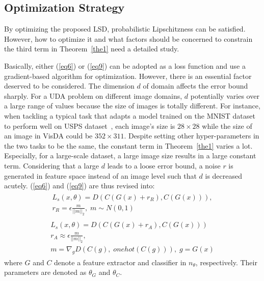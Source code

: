 \documentclass[journal,twocolumn]{IEEEtran}
\theoremstyle{definition}
\begin{document}
\subsection{Optimization Strategy}

By optimizing the proposed LSD,  probabilistic Lipschitzness can be satisfied. However, how to optimize it and what factors should be concerned to constrain the third term in Theorem~\ref{the1} need a detailed study.

Basically, either (\ref{eq6}) or (\ref{eq9}) can be adopted as a loss function and use a gradient-based algorithm for optimization. However, there is an essential factor deserved to be considered. The dimension $d$ of domain affects the error bound sharply. For a UDA problem on different image domains, $d$ potentially varies over a large range of values because the size of images is totally different. For instance, when tackling a typical task that adapts a model trained on the MNIST dataset~\cite{726791} to perform well on USPS dataset~\cite{291440}, each image's size is $28\times28$ while the size of an image in VisDA could be $352\times311$. Despite setting other hyper-parameters in the two tasks to be the same, the constant term in Theorem~\ref{the1} varies a lot. Especially, for a large-scale dataset, a large image size results in a large constant term. Considering that a large $d$ leads to a loose error bound, a noise $r$ is generated in feature space instead of an image level such that $d$ is decreased acutely. (\ref{eq6}) and (\ref{eq9}) are thus revised into:
\begin{align}
\begin{gathered}
L_s(x,\theta)=D(C(G(x)+r_{R}),C(G(x))),\\
r_{R}=\epsilon\frac{m}{||m||_2},\;m\sim N(0,1)\label{eq10}
\end{gathered}
\end{align}
\begin{align}
\begin{gathered}
L_s(x,\theta)=D(C(G(x)+r_{A}),C(G(x)))\\
r_{A}\approx\epsilon\frac{m}{||m||_2},\\
m = \nabla_{g}D(C(g),\;onehot(C(g))),\;g=G(x)\label{eq11}
\end{gathered}
\end{align}
where $G$ and $C$ denote a feature extractor and classifier in $n_\theta$, respectively. Their parameters are denoted as $\theta_G$ and $\theta_C$.
\end{document}
